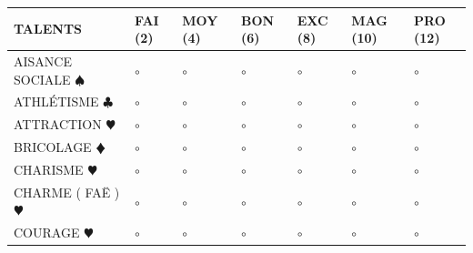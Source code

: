 \documentclass[a5paper,pagesize,french]{book}
\begin{document}


\begin{tabular}[c]{|p{}|p{}|p{}|p{}|p{}|p{}|p{}|}
	\hline
	\textbf{TALENTS}									&	FAI (2)	&	MOY (4)	&	BON (6)	&	EXC (8)	&	MAG (10)	&	PRO (12)	\\ \hline
	AISANCE SOCIALE { $\spadesuit$ }					&	$\circ$	&	$\circ$	&	$\circ$	&	$\circ$	&	$\circ$		&	$\circ$		\\ \hline
	ATHLÉTISME { $\clubsuit$ }							&	$\circ$	&	$\circ$	&	$\circ$	&	$\circ$	&	$\circ$		&	$\circ$		\\ \hline
	ATTRACTION {\color{red} $\varheart$ }				&	$\circ$	&	$\circ$	&	$\circ$	&	$\circ$	&	$\circ$		&	$\circ$		\\ \hline
	BRICOLAGE {\color{red} $\vardiamond$ }				&	$\circ$	&	$\circ$	&	$\circ$	&	$\circ$	&	$\circ$		&	$\circ$		\\ \hline
	CHARISME {\color{red} $\varheart$ }					&	$\circ$	&	$\circ$	&	$\circ$	&	$\circ$	&	$\circ$		&	$\circ$		\\ \hline
	CHARME ( FAË ) {\color{red} $\varheart$ }			&	$\circ$	&	$\circ$	&	$\circ$	&	$\circ$	&	$\circ$		&	$\circ$		\\ \hline
	COURAGE {\color{red} $\varheart$ }					&	$\circ$	&	$\circ$	&	$\circ$	&	$\circ$	&	$\circ$		&	$\circ$		\\ \hline

\end{tabular}
\end{document}

